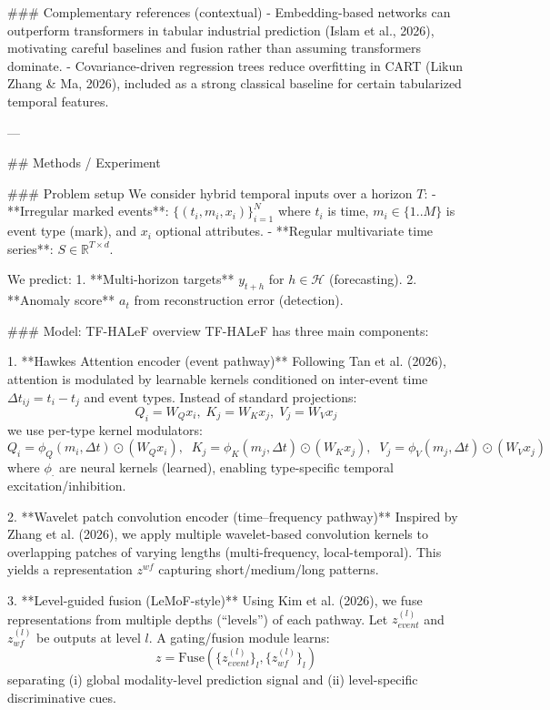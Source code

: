 ### Complementary references (contextual)  
- Embedding-based networks can outperform transformers in tabular industrial prediction (Islam et al., 2026), motivating careful baselines and fusion rather than assuming transformers dominate.  
- Covariance-driven regression trees reduce overfitting in CART (Likun Zhang & Ma, 2026), included as a strong classical baseline for certain tabularized temporal features.  

---

## Methods / Experiment  

### Problem setup  
We consider hybrid temporal inputs over a horizon \(T\):  
- **Irregular marked events**: \(\{(t_i, m_i, x_i)\}_{i=1}^{N}\) where \(t_i\) is time, \(m_i\in\{1..M\}\) is event type (mark), and \(x_i\) optional attributes.  
- **Regular multivariate time series**: \(S \in \mathbb{R}^{T \times d}\).

We predict:  
1. **Multi-horizon targets** \(y_{t+h}\) for \(h\in\mathcal{H}\) (forecasting).  
2. **Anomaly score** \(a_t\) from reconstruction error (detection).

### Model: TF-HALeF overview  
TF-HALeF has three main components:

1. **Hawkes Attention encoder (event pathway)**  
Following Tan et al. (2026), attention is modulated by learnable kernels conditioned on inter-event time \(\Delta t_{ij}=t_i-t_j\) and event types. Instead of standard projections:
\[
Q_i = W_Q x_i,\; K_j=W_K x_j,\; V_j=W_V x_j
\]
we use per-type kernel modulators:
\[
Q_i = \phi_Q(m_i, \Delta t)\odot (W_Q x_i),\;\; K_j=\phi_K(m_j,\Delta t)\odot(W_K x_j),\;\; V_j=\phi_V(m_j,\Delta t)\odot(W_V x_j)
\]
where \(\phi_\cdot\) are neural kernels (learned), enabling type-specific temporal excitation/inhibition.

2. **Wavelet patch convolution encoder (time–frequency pathway)**  
Inspired by Zhang et al. (2026), we apply multiple wavelet-based convolution kernels to overlapping patches of varying lengths (multi-frequency, local-temporal). This yields a representation \(z^{wf}\) capturing short/medium/long patterns.

3. **Level-guided fusion (LeMoF-style)**  
Using Kim et al. (2026), we fuse representations from multiple depths (“levels”) of each pathway. Let \(z^{(l)}_{event}\) and \(z^{(l)}_{wf}\) be outputs at level \(l\). A gating/fusion module learns:
\[
z = \text{Fuse}\left(\{z^{(l)}_{event}\}_{l}, \{z^{(l)}_{wf}\}_{l}\right)
\]
separating (i) global modality-level prediction signal and (ii) level-specific discriminative cues.

